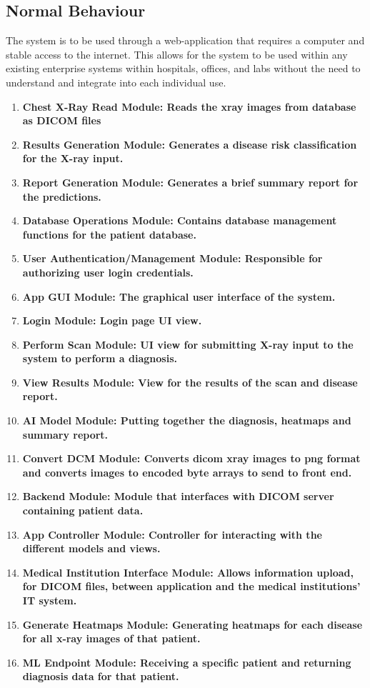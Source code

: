 \documentclass[12pt, titlepage]{article}
\begin{document}
\subsection{Normal Behaviour}
The system is to be used through a web-application that requires a computer and stable access to the internet. This allows for the system to be used within any existing enterprise systems within hospitals, offices, and labs without the need to understand and integrate into each individual use.
\begin{enumerate}
    \item \bf{Chest X-Ray Read Module}: Reads the xray images from database as DICOM files
    \item \bf{Results Generation Module}: Generates a disease risk classification for the X-ray input.
    \item \bf{Report Generation Module}: Generates a brief summary report for the predictions.
    \item \bf{Database Operations Module}: Contains database management functions for the patient database.
    \item \bf{User Authentication/Management Module}: Responsible for authorizing user login credentials.
    \item \bf{App GUI Module}: The graphical user interface of the system.
    \item \bf{Login Module}: Login page UI view.
    \item \bf{Perform Scan Module}: UI view for submitting X-ray input to the system to perform a diagnosis.
    \item \bf{View Results Module}: View for the results of the scan and disease report.
    \item \bf{AI Model Module}: Putting together the diagnosis, heatmaps and summary report.
    \item \bf{Convert DCM Module}: Converts dicom xray images to png format and converts images to encoded byte arrays to send to front end.
    \item \bf{Backend Module}: Module that interfaces with DICOM server containing patient data.
    \item \bf{App Controller Module}: Controller for interacting with the different models and views.
    \item \bf{Medical Institution Interface Module}: Allows information upload, for DICOM files, between application and the medical institutions' IT system.
    \item \bf{Generate Heatmaps Module}: Generating heatmaps for each disease for all x-ray images of that patient.
    \item \bf{ML Endpoint Module}: Receiving a specific patient and returning diagnosis data for that patient.
\end{enumerate}
\end{document}

